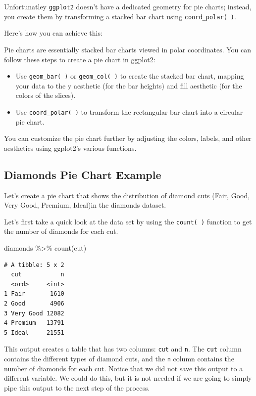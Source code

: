 \documentclass[
  letterpaper,
  DIV=11,
  numbers=noendperiod]{scrreprt}
\newenvironment{Shaded}{\begin{snugshade}}{\end{snugshade}}
\newcommand{\FunctionTok}[1]{\textcolor[rgb]{0.28,0.35,0.67}{#1}}
\newcommand{\NormalTok}[1]{\textcolor[rgb]{0.00,0.23,0.31}{#1}}
\newcommand{\SpecialCharTok}[1]{\textcolor[rgb]{0.37,0.37,0.37}{#1}}
\providecommand{\tightlist}{%
  \setlength{\itemsep}{0pt}\setlength{\parskip}{0pt}}\usepackage{longtable,booktabs,array}
\begin{document}
Unfortunatley \texttt{ggplot2} doesn't have a dedicated geometry for pie
charts; instead, you create them by transforming a stacked bar chart
using \texttt{coord\_polar(\ )}.

Here's how you can achieve this:

Pie charts are essentially stacked bar charts viewed in polar
coordinates. You can follow these steps to create a pie chart in
ggplot2:

\begin{itemize}
\tightlist
\item
  Use \texttt{geom\_bar(\ )} or \texttt{geom\_col(\ )} to create the
  stacked bar chart, mapping your data to the y aesthetic (for the bar
  heights) and fill aesthetic (for the colors of the slices).
\item
  Use \texttt{coord\_polar(\ )} to transform the rectangular bar chart
  into a circular pie chart.
\end{itemize}

You can customize the pie chart further by adjusting the colors, labels,
and other aesthetics using ggplot2's various functions.

\subsection*{Diamonds Pie Chart
Example}\label{diamonds-pie-chart-example}

Let's create a pie chart that shows the distribution of diamond cuts
(Fair, Good, Very Good, Premium, Ideal)in the diamonds dataset.

Let's first take a quick look at the data set by using the
\texttt{count(\ )} function to get the number of diamonds for each cut.

\begin{Shaded}
\begin{Highlighting}[]
\NormalTok{diamonds }\SpecialCharTok{\%\textgreater{}\%} \FunctionTok{count}\NormalTok{(cut)}
\end{Highlighting}
\end{Shaded}

\begin{verbatim}
# A tibble: 5 x 2
  cut           n
  <ord>     <int>
1 Fair       1610
2 Good       4906
3 Very Good 12082
4 Premium   13791
5 Ideal     21551
\end{verbatim}

This output creates a table that has two columns: \texttt{cut} and
\texttt{n}. The \texttt{cut} column contains the different types of
diamond cuts, and the \texttt{n} column contains the number of diamonds
for each cut. Notice that we did not save this output to a different
variable. We could do this, but it is not needed if we are going to
simply pipe this output to the next step of the process.
\end{document}
